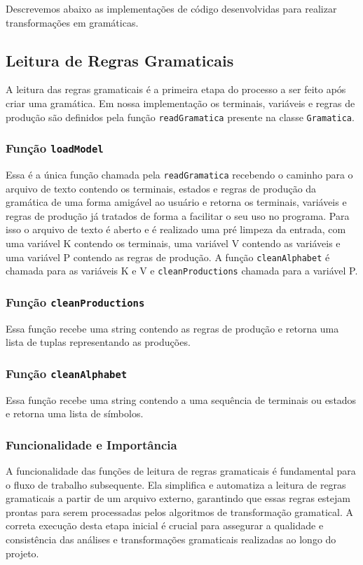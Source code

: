 \documentclass[a4paper,12pt]{article} %
\begin{document}
Descrevemos abaixo as implementações de código desenvolvidas para realizar transformações em gramáticas.

\subsection{Leitura de Regras Gramaticais}

A leitura das regras gramaticais é a primeira etapa do processo a ser feito após criar uma gramática. Em nossa implementação os terminais, variáveis e regras de produção são definidos pela função \texttt{readGramatica} presente na classe \texttt{Gramatica}.

\subsubsection{Função \texttt{loadModel}}

Essa é a única função chamada pela \texttt{readGramatica} recebendo o caminho para o arquivo de texto contendo os terminais, estados e regras de produção da gramática de uma forma amigável ao usuário e retorna os terminais, variáveis e regras de produção já tratados de forma a facilitar o seu uso no programa. Para isso o arquivo de texto é aberto e é realizado uma pré limpeza da entrada, com uma variável K contendo os terminais, uma variável V contendo as variáveis e uma variável P contendo as regras de produção. A função \texttt{cleanAlphabet} é chamada para as variáveis K e V e \texttt{cleanProductions} chamada para a variável P.

\subsubsection{Função \texttt{cleanProductions}}
Essa função recebe uma string contendo as regras de produção e retorna uma lista de tuplas representando as produções.

\subsubsection{Função \texttt{cleanAlphabet}}
Essa função recebe uma string contendo a uma sequência de terminais ou estados e retorna uma lista de símbolos.

\subsubsection{Funcionalidade e Importância}

A funcionalidade das funções de leitura de regras gramaticais é fundamental para o fluxo de trabalho subsequente. Ela simplifica e automatiza a leitura de regras gramaticais a partir de um arquivo externo, garantindo que essas regras estejam prontas para serem processadas pelos algoritmos de transformação gramatical. A correta execução desta etapa inicial é crucial para assegurar a qualidade e consistência das análises e transformações gramaticais realizadas ao longo do projeto.
\end{document}
